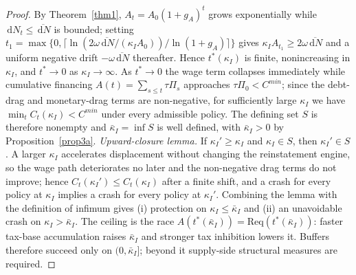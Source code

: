 \documentclass[review,12pt]{elsarticle}
\theoremstyle{plain}
\theoremstyle{definition}
\theoremstyle{remark}
\newcommand{\dd}{\,\mathrm{d}}
\begin{document}
\begin{proof}
By Theorem~\ref{thm1}, $A_t=A_0(1+g_A)^t$ grows exponentially while $\dd N_t\le\overline{\dd N}$ is bounded; setting $t_1=\max\{0,\lceil\ln(2\omega\overline{\dd N}/(\kappa_I A_0))/\ln(1+g_A)\rceil\}$ gives $\kappa_I A_{t_1}\ge2\omega\overline{\dd N}$ and a uniform negative drift $-\omega\overline{\dd N}$ thereafter. Hence $t^*(\kappa_I)$ is finite, nonincreasing in $\kappa_I$, and $t^*\to0$ as $\kappa_I\to\infty$. As $t^*\to0$ the wage term collapses immediately while cumulative financing $A(t)=\sum_{s\le t}\tau\Pi_s$ approaches $\tau\Pi_0<C^{min}$; since the debt-drag and monetary-drag terms are non-negative, for sufficiently large $\kappa_I$ we have $\min_t C_t(\kappa_I)<C^{min}$ under every admissible policy. The defining set $S$ is therefore nonempty and $\bar\kappa_I=\inf S$ is well defined, with $\bar\kappa_I>0$ by Proposition~\ref{prop3a}.
\smallskip\noindent\emph{Upward-closure lemma.} If $\kappa_I'\ge\kappa_I$ and $\kappa_I\in S$, then $\kappa_I'\in S$. A larger $\kappa_I$ accelerates displacement without changing the reinstatement engine, so the wage path deteriorates no later and the non-negative drag terms do not improve; hence $C_t(\kappa_I')\le C_t(\kappa_I)$ after a finite shift, and a crash for every policy at $\kappa_I$ implies a crash for every policy at $\kappa_I'$. Combining the lemma with the definition of infimum gives (i) protection on $\kappa_I\le\bar\kappa_I$ and (ii) an unavoidable crash on $\kappa_I>\bar\kappa_I$. The ceiling is the race $A(t^*(\bar\kappa_I))=\mathrm{Req}(t^*(\bar\kappa_I))$: faster tax-base accumulation raises $\bar\kappa_I$ and stronger tax inhibition lowers it. Buffers therefore succeed only on $(0,\bar\kappa_I]$; beyond it supply-side structural measures are required.
\end{proof}
\end{document}
